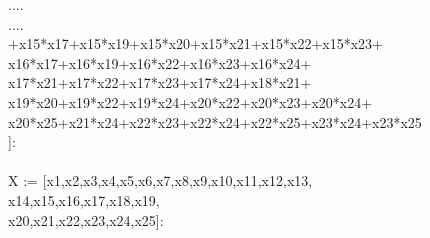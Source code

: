 \documentclass[letterpaper,12pt,titlepage,oneside,final]{book}
\newcounter{Table}
\newenvironment{codefont}{\footnotesize\ttfamily}{\par}
\let\origdoublepage\cleardoublepage
\newcommand{\clearemptydoublepage}{%
  \clearpage{\pagestyle{empty}\origdoublepage}}
\let\cleardoublepage\clearemptydoublepage
\begin{document}
\begin{appendices}
\begin{codefont}
....\\
....\\
+x15*x17+x15*x19+x15*x20+x15*x21+x15*x22+x15*x23+\\x16*x17+x16*x19+x16*x22+x16*x23+x16*x24+\\x17*x21+x17*x22+x17*x23+x17*x24+x18*x21+\\x19*x20+x19*x22+x19*x24+x20*x22+x20*x23+x20*x24+\\x20*x25+x21*x24+x22*x23+x22*x24+x22*x25+x23*x24+x23*x25\\
]:\\
\\
X := [x1,x2,x3,x4,x5,x6,x7,x8,x9,x10,x11,x12,x13,\\x14,x15,x16,x17,x18,x19,\\
x20,x21,x22,x23,x24,x25]:
\end{codefont}


\end{appendices}









\cleardoublepage %
\renewcommand*{\bibname}{References}




\nocite{*}
\end{document}
